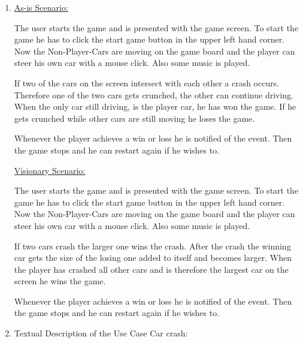 \documentclass[a4paper, 10pt]{article}
\begin{document}
\begin{enumerate}
    \item 
    \underline{As-is Scenario:}

    The user starts the game and is presented with the game screen.
    To start the game he has to click the start game button in the upper left hand corner.
    Now the Non-Player-Cars are moving on the game board and the player can steer his own car 
    with a mouse click. Also some music is played.

    If two of the cars on the screen intersect with each other a crash occurs. Therefore one of the 
    two cars gets crunched, the other can continue driving.
    When the only car still driving, is the player car, he has won the game. If he gets crunched 
    while other cars are still moving he loses the game.

    Whenever the player achieves a win or loss he is notified of the event. Then the game stops and 
    he can restart again if he wishes to.

    \underline{Visionary Scenario:}
    
    The user starts the game and is presented with the game screen.
    To start the game he has to click the start game button in the upper left hand corner.
    Now the Non-Player-Cars are moving on the game board and the player can steer his own car 
    with a mouse click. Also some music is played.

    If two cars crash the larger one wins the crash. After the crash the winning car gets
    the size of the losing one added to itself and becomes larger. 
    When the player has crashed all other cars and is therefore the largest car on the screen he wins
    the game.

    Whenever the player achieves a win or loss he is notified of the event. Then the game stops and 
    he can restart again if he wishes to.

    \item 
    Textual Description of the Use Case Car crash:


\end{enumerate}
\end{document}
